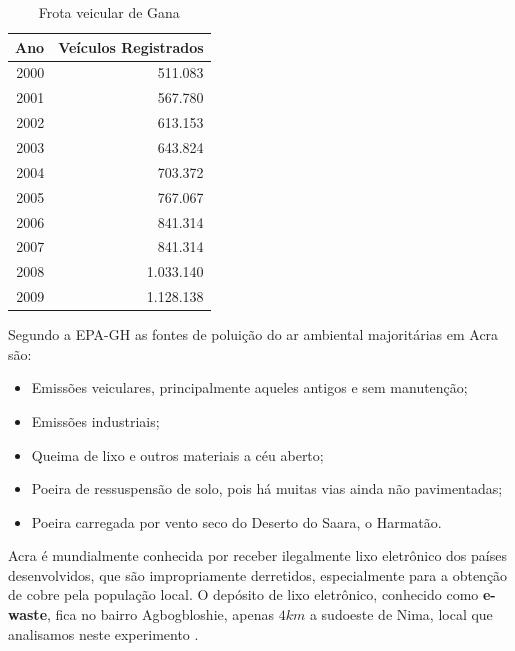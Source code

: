 \begin{table}[H]
 \centering
  \begin{tabular}{rr}
  \hline
  Ano & Veículos Registrados \\ 
  \hline
  2000 & 511.083 \\ 
  2001 & 567.780 \\ 
  2002 & 613.153 \\ 
  2003 & 643.824 \\ 
  2004 & 703.372 \\ 
  2005 & 767.067 \\ 
  2006 & 841.314 \\ 
  2007 & 841.314 \\ 
  2008 & 1.033.140 \\ 
  2009 & 1.128.138 \\ 
  \hline
  \end{tabular}
  \caption{Frota veicular de Gana \citep{dvla} \label{table:dvla}}
\end{table}


Segundo a EPA-GH \citep{epa2015} as fontes de poluição do ar ambiental 
majoritárias em Acra são:

\begin{itemize}
 \item Emissões veiculares, principalmente aqueles antigos e sem 
       manutenção;
 \item Emissões industriais;
 \item Queima de lixo e outros materiais a céu aberto;
 \item Poeira de ressuspensão de solo, pois há muitas vias ainda não pavimentadas;
 \item Poeira carregada por vento seco do Deserto do Saara, o Harmatão.
\end{itemize}

Acra é mundialmente conhecida por receber ilegalmente lixo 
eletrônico dos países desenvolvidos, que são impropriamente derretidos, 
especialmente para a obtenção de cobre pela população local. 
O depósito de lixo eletrônico, conhecido como \textbf{e-waste}, 
fica no bairro Agbogbloshie, apenas $4 km$ a sudoeste de Nima, 
local que analisamos neste experimento \citep{asampong2015}.

